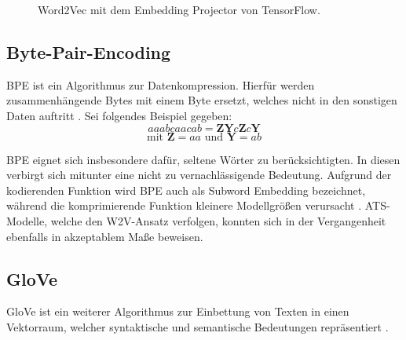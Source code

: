 \begin{figure}[h!]
  \centering
  \caption{Word2Vec mit dem Embedding Projector von TensorFlow.}
  \label{pic:OnlineSphere}
\end{figure}


\subsection{Byte-Pair-Encoding}
\noindent
\ac{BPE} ist ein Algorithmus zur Datenkompression. Hierfür werden zusammenhängende Bytes mit einem Byte ersetzt, welches nicht in den sonstigen Daten auftritt \cite[S.~24]{NIT19}. Sei folgendes Beispiel gegeben: $$aaabcaacab = \boldsymbol{Z}\boldsymbol{Y}c\boldsymbol{Z}c\boldsymbol{Y}$$ $$\text{mit } \boldsymbol{Z} = aa \text{ und } \boldsymbol{Y} = ab$$

\noindent
\ac{BPE} eignet sich insbesondere dafür, seltene Wörter zu berücksichtigten. In diesen verbirgt sich mitunter eine nicht zu vernachlässigende Bedeutung. Aufgrund der kodierenden Funktion wird \ac{BPE} auch als Subword Embedding bezeichnet, während die komprimierende Funktion kleinere Modellgrößen verursacht \cite[S.~24]{NIT19}. \ac{ATS}-Modelle, welche den \ac{W2V}-Ansatz verfolgen, konnten sich in der Vergangenheit ebenfalls in akzeptablem Maße beweisen.
\newpage


\subsection{GloVe}
\noindent
\ac{GloVe} ist ein weiterer Algorithmus zur Einbettung von Texten in einen Vektorraum, welcher syntaktische und semantische Bedeutungen repräsentiert \cite[S.~1]{PEN14}.\\

